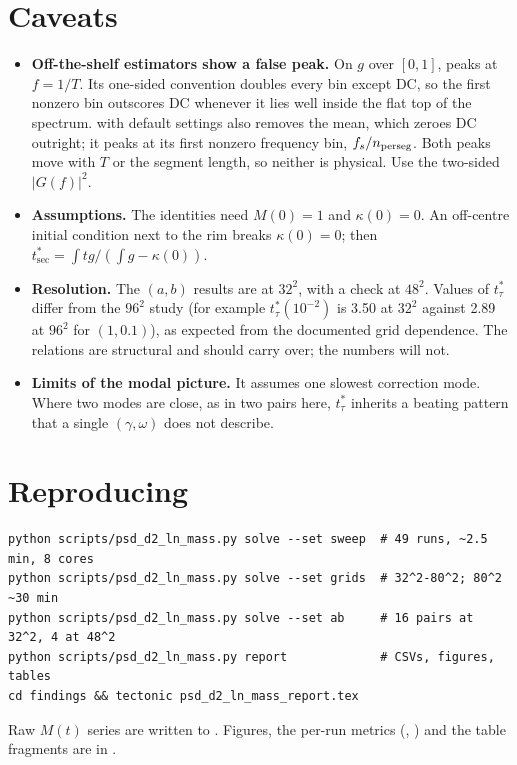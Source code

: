 \documentclass[11pt]{article}
\newcommand{\tabdir}{../results/2026-10-15_psd-d2-ln-mass/tex}
\newcommand{\tsec}{t^*_{\mathrm{sec}}}
\newcommand{\ttau}{t^*_{\tau}}
\begin{document}
\begin{table}[H]
\centering
\small

\caption{The $b=0.1$ column at $32^2$ and $48^2$. The values move with the grid,
as every quantity in this project does, but the relations between them do not:
$\gamma_\tau\approx\gamma$, $\ttau$ falls just before $t_{\rm env}$, and $f_{\max}$
departs from $\omega/2\pi$ as $a$ grows.}
\label{tab:abgrid}
\end{table}

\section{Caveats}
\begin{itemize}
\item \textbf{Off-the-shelf estimators show a false peak.} On $g$ over $[0,1]$,
   peaks at $f=1/T$. Its one-sided convention
  doubles every bin except DC, so the first nonzero bin outscores DC whenever it
  lies well inside the flat top of the spectrum.  with
  default settings also removes the mean, which zeroes DC outright; it peaks at
  its first nonzero frequency bin, $f_s/n_{\rm perseg}$. Both peaks move with $T$
  or the segment length, so neither is physical. Use the two-sided $|G(f)|^2$.
\item \textbf{Assumptions.} The identities need $M(0)=1$ and $\kappa(0)=0$. An
  off-centre initial condition next to the rim breaks $\kappa(0)=0$; then
  $\tsec=\int tg/(\int g-\kappa(0))$.
\item \textbf{Resolution.} The $(a,b)$ results are at $32^2$, with a check at
  $48^2$. Values of $\ttau$ differ from the $96^2$ study (for example
  $\ttau(10^{-2})$ is 3.50 at $32^2$ against 2.89 at $96^2$ for $(1,0.1)$), as
  expected from the documented grid dependence. The relations are structural and
  should carry over; the numbers will not.
\item \textbf{Limits of the modal picture.} It assumes one slowest correction
  mode. Where two modes are close, as in two pairs here, $\ttau$ inherits a
  beating pattern that a single $(\gamma,\omega)$ does not describe.
\end{itemize}

\section{Reproducing}
{\small
\begin{verbatim}
python scripts/psd_d2_ln_mass.py solve --set sweep  # 49 runs, ~2.5 min, 8 cores
python scripts/psd_d2_ln_mass.py solve --set grids  # 32^2-80^2; 80^2 ~30 min
python scripts/psd_d2_ln_mass.py solve --set ab     # 16 pairs at 32^2, 4 at 48^2
python scripts/psd_d2_ln_mass.py report             # CSVs, figures, tables
cd findings && tectonic psd_d2_ln_mass_report.tex
\end{verbatim}}
Raw $M(t)$ series are written to .
Figures, the per-run metrics (, ) and the
table fragments are in .
\end{document}

